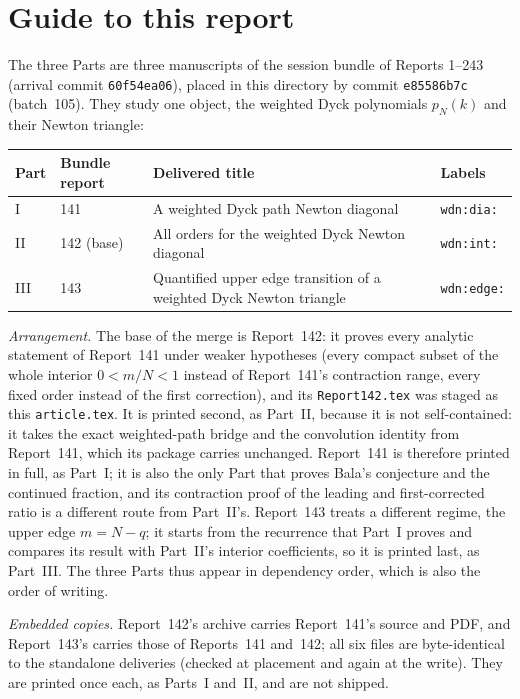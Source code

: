 \documentclass[11pt,letterpaper]{article}
\theoremstyle{remark}\newtheorem{remark}[theorem]{Remark}
\newcommand{\file}[1]{\nolinkurl{#1}}
\begin{document}
\section*{Guide to this report}\label{wdn:sec:guide}
The three Parts are three manuscripts of the session bundle of Reports 1--243 (arrival commit \texttt{60f54ea06}), placed in this directory by commit \texttt{e85586b7c} (batch~105). They study one object, the weighted Dyck polynomials $p_N(k)$ and their Newton triangle:
\begin{center}
\small
\begin{tabular}{@{}l l >{\raggedright\arraybackslash}p{} l@{}}
\toprule
Part & Bundle report & Delivered title & Labels\\
\midrule
I & 141 & A weighted Dyck path Newton diagonal & \texttt{wdn:dia:}\\
II & 142 (base) & All orders for the weighted Dyck Newton diagonal & \texttt{wdn:int:}\\
III & 143 & Quantified upper edge transition of a weighted Dyck Newton triangle & \texttt{wdn:edge:}\\
\bottomrule
\end{tabular}
\end{center}
\emph{Arrangement.} The base of the merge is Report~142: it proves every analytic statement of Report~141 under weaker hypotheses (every compact subset of the whole interior $0<m/N<1$ instead of Report~141's contraction range, every fixed order instead of the first correction), and its \file{Report142.tex} was staged as this \file{article.tex}. It is printed second, as Part~II, because it is not self-contained: it takes the exact weighted-path bridge and the convolution identity from Report~141, which its package carries unchanged. Report~141 is therefore printed in full, as Part~I; it is also the only Part that proves Bala's conjecture and the continued fraction, and its contraction proof of the leading and first-corrected ratio is a different route from Part~II's. Report~143 treats a different regime, the upper edge $m=N-q$; it starts from the recurrence that Part~I proves and compares its result with Part~II's interior coefficients, so it is printed last, as Part~III. The three Parts thus appear in dependency order, which is also the order of writing.

\emph{Embedded copies.} Report~142's archive carries Report~141's source and PDF, and Report~143's carries those of Reports~141 and~142; all six files are byte-identical to the standalone deliveries (checked at placement and again at the write). They are printed once each, as Parts~I and~II, and are not shipped.
\end{document}
